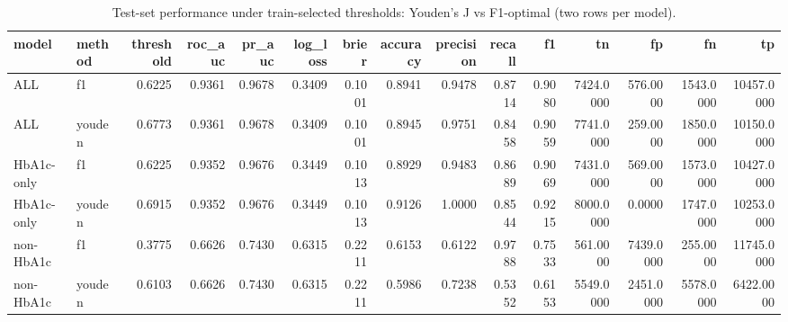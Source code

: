 \begin{table}[H]
\begin{center}
\begin{tabular}{llrrrrrrrrrrrrr}
\toprule
model & method & threshold & roc_auc & pr_auc & log_loss & brier & accuracy & precision & recall & f1 & tn & fp & fn & tp \\
\midrule
ALL & f1 & 0.6225 & 0.9361 & 0.9678 & 0.3409 & 0.1001 & 0.8941 & 0.9478 & 0.8714 & 0.9080 & 7424.0000 & 576.0000 & 1543.0000 & 10457.0000 \\
ALL & youden & 0.6773 & 0.9361 & 0.9678 & 0.3409 & 0.1001 & 0.8945 & 0.9751 & 0.8458 & 0.9059 & 7741.0000 & 259.0000 & 1850.0000 & 10150.0000 \\
HbA1c-only & f1 & 0.6225 & 0.9352 & 0.9676 & 0.3449 & 0.1013 & 0.8929 & 0.9483 & 0.8689 & 0.9069 & 7431.0000 & 569.0000 & 1573.0000 & 10427.0000 \\
HbA1c-only & youden & 0.6915 & 0.9352 & 0.9676 & 0.3449 & 0.1013 & 0.9126 & 1.0000 & 0.8544 & 0.9215 & 8000.0000 & 0.0000 & 1747.0000 & 10253.0000 \\
non-HbA1c & f1 & 0.3775 & 0.6626 & 0.7430 & 0.6315 & 0.2211 & 0.6153 & 0.6122 & 0.9788 & 0.7533 & 561.0000 & 7439.0000 & 255.0000 & 11745.0000 \\
non-HbA1c & youden & 0.6103 & 0.6626 & 0.7430 & 0.6315 & 0.2211 & 0.5986 & 0.7238 & 0.5352 & 0.6153 & 5549.0000 & 2451.0000 & 5578.0000 & 6422.0000 \\
\bottomrule
\end{tabular}
\end{center}
\vspace{-5pt}
\caption{Test-set performance under train-selected thresholds: Youden’s J vs F1-optimal (two rows per model).}
\label{tab:logit_test_threshold_rule_comparison}
\end{table}
